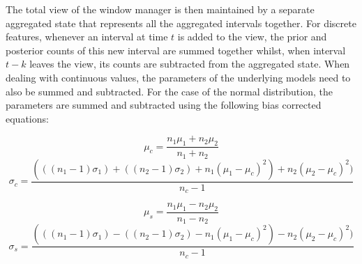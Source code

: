 \documentclass[a4paper,11pt]{scrreprt}
\begin{document}
The total view of the window manager is then maintained by a separate aggregated state that represents all the aggregated intervals together. For discrete features, whenever an interval at time \(t\) is added to the view, the prior and posterior counts of this new interval are summed together whilst, when interval \(t-k\) leaves the view, its counts are subtracted from the aggregated state. When dealing with continuous values, the parameters of the underlying models need to also be summed and subtracted. For the case of the normal distribution, the parameters are summed and subtracted using the following bias corrected equations:
\newpage
\begin{myequations}
\begin{equation}
\mu_c = \frac{n_1\mu_1 + n_2\mu_2}{n_1 + n_2}
\end{equation}
\begin{equation}
\sigma_c = \frac{(((n_1 -1) \sigma_1) + ((n_2-1) \sigma_2) + n_1(\mu_1 - \mu_c)^2) + n_2(\mu_2 - \mu_c)^2)}{n_c-1}
\end{equation}
\label{eq:combiningparamsadd}
\end{myequations}

\begin{myequations}
\begin{equation}
\mu_s = \frac{n_1\mu_1 - n_2\mu_2}{n_1 - n_2}
\end{equation}
\begin{equation}
\sigma_s = \frac{(((n_1 -1) \sigma_1) - ((n_2-1) \sigma_2) - n_1(\mu_1 - \mu_c)^2) - n_2(\mu_2 - \mu_c)^2)}{n_c-1}
\end{equation}
\label{eq:combiningparamssub}
\end{myequations}
 
\end{document}
